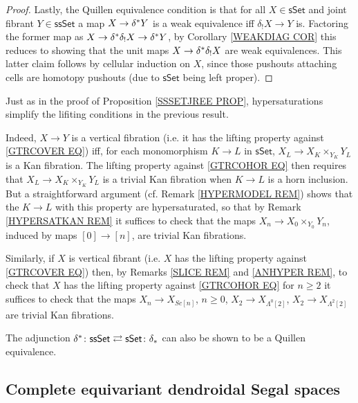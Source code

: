\documentclass[a4paper,10pt
 ,draft
]{article}%
\begin{document}
\begin{proof}
Lastly, the Quillen equivalence condition 
is that for all $X \in \mathsf{sSet}$ and joint fibrant
$Y \in \mathsf{ssSet}$ a map
$X \to \delta^{\**} Y$ is a weak equivalence iff 
$\delta_!X \to Y$ is. Factoring the former map as
$X \to \delta^{\**} \delta_! X \to \delta^{\**} Y$,
by Corollary \ref{WEAKDIAG COR}
this reduces to showing
that the unit maps $X \to \delta^{\**} \delta_! X$
are weak equivalences. This latter claim follows by cellular induction on $X$, since those pushouts attaching cells are homotopy pushouts (due to $\mathsf{sSet}$ being left proper).
\end{proof}


\begin{remark}\label{HYPERSIMPL REM}
	Just as in the proof of Proposition \ref{SSSETJREE PROP}, hypersaturations simplify the lifiting conditions
	in the previous result. 
	
	Indeed,	$X \to Y$ is a vertical fibration (i.e. it has the lifting property against \eqref{GTRCOVER EQ})
	iff, for each monomorphism $K \to L$ in $\mathsf{sSet}$,
	$X_L \to X_K \times_{Y_K} Y_L$
	is a Kan fibration.
	The lifting property against \eqref{GTRCOHOR EQ}
	then requires that 
	$X_L \to X_K \times_{Y_K} Y_L$ is a trivial Kan fibration
	when $K \to L$ is a horn inclusion. 
	But a straightforward argument (cf. Remark \ref{HYPERMODEL REM}) shows that the $K \to L$ with this property are hypersaturated,
	so that by 
Remark \ref{HYPERSATKAN REM} it suffices to check that the maps $X_n \to X_0 \times_{Y_0} Y_n$, induced by maps $[0] \to [n]$, are trivial Kan fibrations.

	Similarly, if $X$ is vertical fibrant (i.e. $X$ has the lifting property against \eqref{GTRCOVER EQ}) then, by 
	Remarks \ref{SLICE REM} and \ref{ANHYPER REM}, to check that $X$ has the lifting property against \eqref{GTRCOHOR EQ} for $n\geq 2$
	it suffices to check that the maps
	$X_n \to X_{Sc[n]}$, $n\geq 0$, 
	$X_2 \to X_{\Lambda^0[2]}$,
	$X_2 \to X_{\Lambda^2[2]}$ are trivial Kan fibrations.
\end{remark}


\begin{remark}
The adjunction 
$
	\delta^{\**}\colon \mathsf{ssSet}
		\rightleftarrows 
	\mathsf{sSet} \colon \delta_{\**}
$
can also be shown to be a Quillen equivalence.
\end{remark}


\subsection{Complete equivariant dendroidal Segal spaces}
\label{CEDSS SEC}
\end{document}
